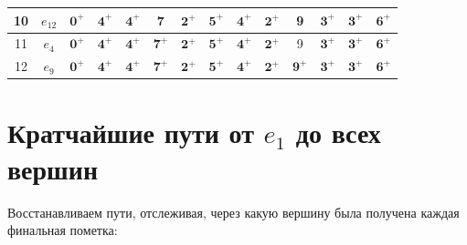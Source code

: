 \documentclass[a4paper,12pt]{article}
\begin{document}
\begin{center}
\begin{tabular}{|c|c||c|c|c|c|c|c|c|c|c|c|c|c|}
		\hline
		10             & $e_{12}$                   &
		$\mathbf{0^+}$ & $\mathbf{4^+}$             & $\mathbf{4^+}$             & 7                          & $\mathbf{2^+}$             & $\mathbf{5^+}$             & $\mathbf{4^+}$             & $\mathbf{2^+}$             & 9                          & $\mathbf{3^+}$             & $\mathbf{3^+}$             & \underline{$\mathbf{6^+}$}                  \\
		\hline
		11             & $e_4$                      &
		$\mathbf{0^+}$ & $\mathbf{4^+}$             & $\mathbf{4^+}$             & \underline{$\mathbf{7^+}$} & $\mathbf{2^+}$             & $\mathbf{5^+}$             & $\mathbf{4^+}$             & $\mathbf{2^+}$             & 9                          & $\mathbf{3^+}$             & $\mathbf{3^+}$             & $\mathbf{6^+}$                              \\
		\hline
		12             & $e_9$                      &
		$\mathbf{0^+}$ & $\mathbf{4^+}$             & $\mathbf{4^+}$             & $\mathbf{7^+}$             & $\mathbf{2^+}$             & $\mathbf{5^+}$             & $\mathbf{4^+}$             & $\mathbf{2^+}$             & \underline{$\mathbf{9^+}$} & $\mathbf{3^+}$             & $\mathbf{3^+}$             & $\mathbf{6^+}$                              \\
		\hline
	\end{tabular}
\end{center}

\section*{Кратчайшие пути от $e_1$ до всех вершин}

Восстанавливаем пути, отслеживая, через какую вершину была получена каждая финальная пометка:
\end{document}
